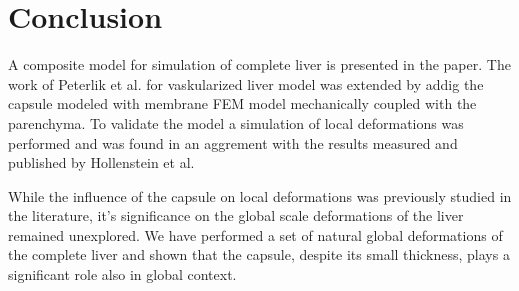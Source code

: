 \documentclass{llncs}
\begin{document}

\section{Conclusion} %

A composite model for simulation of complete liver is presented in the
paper. The work of Peterlik et al. for vaskularized liver model was
extended by addig the capsule modeled with membrane FEM model mechanically
coupled with the parenchyma. To validate the model a simulation of local
deformations was performed and was found in an aggrement with the results
measured and published by Hollenstein et al.

While the influence of the capsule on local deformations was previously
studied in the literature, it's significance on the global scale
deformations of the liver remained unexplored. We have performed a set of
natural global deformations of the complete liver and shown that the
capsule, despite its small thickness, plays a significant role also in
global context.


%
%



\end{document}
